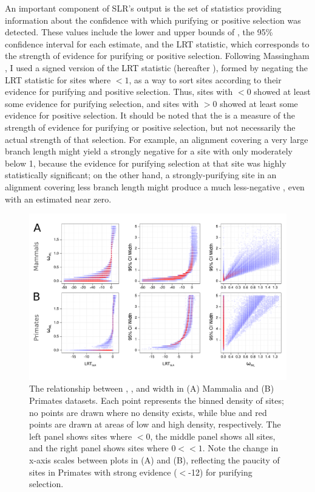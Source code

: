 An important component of SLR's output is the set of statistics
providing information about the confidence with which purifying or
positive selection was detected. These values include the lower and
upper bounds of \ci, the 95\% confidence interval for each \omgml
estimate, and the LRT statistic, which corresponds to the strength of
evidence for purifying or positive selection. Following Massingham
\citeyearpar{Massingham2005}, I used a signed version of the LRT
statistic (hereafter \slrt), formed by negating the LRT statistic for
sites where \omgml$<1$, as a way to sort sites according to their
evidence for purifying and positive selection. Thus, sites with
\slrt$<0$ showed at least some evidence for purifying selection, and
sites with \slrt$>0$ showed at least some evidence for positive
selection. It should be noted that the \slrt is a measure of the
strength of evidence for purifying or positive selection, but not
necessarily the actual strength of that selection. For example, an
alignment covering a very large branch length might yield a strongly
negative \slrt for a site with \omgml only moderately below 1, because
the evidence for purifying selection at that site was highly
statistically significant; on the other hand, a strongly-purifying
site in an alignment covering less branch length might produce a much
less-negative \slrt, even with an estimated  \omgml near zero.

\begin{figure}[b!]
\centering
\includegraphics[scale=0.5]{Figs/sites_scatters.pdf}
\caption{The relationship between \slrt, \omgml, and \ci width in (A)
  Mammalia and (B) Primates datasets. Each point represents the binned
  density of sites; no points are drawn where no density exists, while
  blue and red points are drawn at areas of low and high density,
  respectively. The left panel shows sites where \omgml$<0$, the
  middle panel shows all sites, and the right panel shows sites where
  $0<$\xspace\omgml$<1$. Note the change in x-axis scales between plots
  in (A) and (B), reflecting the paucity of sites in Primates with
  strong evidence (\slrt$<$-12) for purifying selection.}
\label{fig_sites_scatters}
\end{figure}

